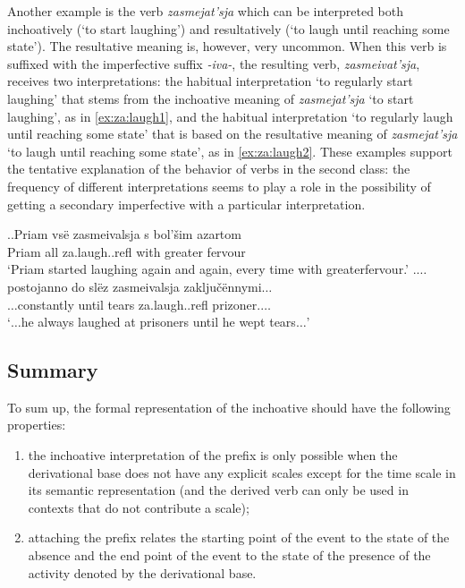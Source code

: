 Another example is the verb \textit{zasmejat'sja} which can be interpreted both inchoatively (`to start laughing') and resultatively (`to laugh until reaching some state'). The resultative meaning is, however, very uncommon. When this verb is suffixed with the imperfective suffix \textit{-iva-}, the resulting verb, \textit{zasmeivat'sja}, receives two interpretations: the habitual interpretation `to regularly start laughing' that stems from the inchoative meaning of \textit{zasmejat'sja} `to start laughing', as in \ref{ex:za:laugh1}, and the habitual interpretation `to regularly laugh until reaching some state' that is based on the resultative meaning of \textit{zasmejat'sja} `to laugh until reaching some state', as in \ref{ex:za:laugh2}. These examples support the tentative explanation of the behavior of verbs in the second class: the frequency of different interpretations seems to play a role in the possibility of getting a secondary imperfective with a particular interpretation.

\ex.\label{ex:za:laugh}\ag.\label{ex:za:laugh1}Priam vs\"{e} zasmeivalsja s bol'\v{s}im azartom\\
Priam all za.laugh..refl with greater fervour\\
\trans `Priam started laughing again and again, every time with greater\linebreak fervour.'
\bg.\label{ex:za:laugh2}$\ldots$postojanno do sl\"{e}z zasmeivalsja zaklju\v{c}\"{e}nnymi$\ldots$\\
$\ldots$constantly until tears za.laugh..refl prizoner.$\ldots$\\
\trans `$\ldots$he always laughed at prisoners until he wept tears$\ldots$'


\subsection{Summary}
To sum up, the formal representation of the inchoative  should have the following properties: 
\begin{enumerate}
\item the inchoative interpretation of the prefix is only possible when the derivational base does not have any explicit scales except for the time scale in its semantic representation (and the derived verb can only be used in contexts that do not contribute a scale);
\item attaching the prefix  relates the starting point of the event to the state of the absence and the end point of the event to the state of the presence of the activity denoted by the derivational base.
\end{enumerate}


